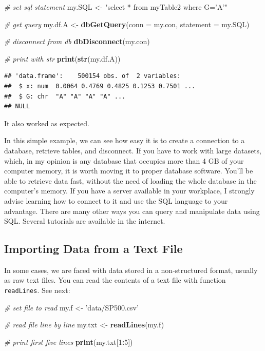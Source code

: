 \documentclass[11pt,]{book}
\newenvironment{Shaded}{\begin{snugshade}}{\end{snugshade}}
\newcommand{\KeywordTok}[1]{\textcolor[rgb]{0.27,0.27,0.27}{\textbf{#1}}}
\newcommand{\DataTypeTok}[1]{\textcolor[rgb]{0.27,0.27,0.27}{#1}}
\newcommand{\DecValTok}[1]{\textcolor[rgb]{0.06,0.06,0.06}{#1}}
\newcommand{\StringTok}[1]{\textcolor[rgb]{0.5,0.5,0.5}{#1}}
\newcommand{\CommentTok}[1]{\textcolor[rgb]{0.56,0.35,0.01}{\textit{#1}}}
\newcommand{\OperatorTok}[1]{\textcolor[rgb]{0.81,0.36,0.00}{\textbf{#1}}}
\newcommand{\NormalTok}[1]{#1}
\begin{document}
\begin{Shaded}
\begin{Highlighting}[]
\CommentTok{# set sql statement}
\NormalTok{my.SQL <-}\StringTok{ "select * from myTable2 where G='A'"}

\CommentTok{# get query}
\NormalTok{my.df.A <-}\StringTok{ }\KeywordTok{dbGetQuery}\NormalTok{(}\DataTypeTok{conn =}\NormalTok{ my.con, }\DataTypeTok{statement =}\NormalTok{ my.SQL)}

\CommentTok{# disconnect from db}
\KeywordTok{dbDisconnect}\NormalTok{(my.con)}

\CommentTok{# print with str}
\KeywordTok{print}\NormalTok{(}\KeywordTok{str}\NormalTok{(my.df.A))}
\end{Highlighting}
\end{Shaded}

\begin{verbatim}
## 'data.frame':    500154 obs. of  2 variables:
##  $ x: num  0.0064 0.4769 0.4825 0.1253 0.7501 ...
##  $ G: chr  "A" "A" "A" "A" ...
## NULL
\end{verbatim}

It also worked as expected.

In this simple example, we can see how easy it is to create a connection
to a database, retrieve tables, and disconnect. If you have to work with
large datasets, which, in my opinion is any database that occupies more
than 4 GB of your computer memory, it is worth moving it to proper
database software. You'll be able to retrieve data fast, without the
need of loading the whole database in the computer's memory. If you have
a server available in your workplace, I strongly advise learning how to
connect to it and use the SQL language to your advantage. There are many
other ways you can query and manipulate data using SQL. Several
tutorials are available in the internet.

\subsection{Importing Data from a Text
File}\label{importing-data-from-a-text-file}

In some cases, we are faced with data stored in a non-structured format,
usually as raw text files. You can read the contents of a text file with
function \texttt{readLines}. See next: 

\begin{Shaded}
\begin{Highlighting}[]
\CommentTok{# set file to read}
\NormalTok{my.f <-}\StringTok{ 'data/SP500.csv'}

\CommentTok{# read file line by line}
\NormalTok{my.txt <-}\StringTok{ }\KeywordTok{readLines}\NormalTok{(my.f)}

\CommentTok{# print first five lines}
\KeywordTok{print}\NormalTok{(my.txt[}\DecValTok{1}\OperatorTok{:}\DecValTok{5}\NormalTok{])}
\end{Highlighting}
\end{Shaded}
\end{document}
